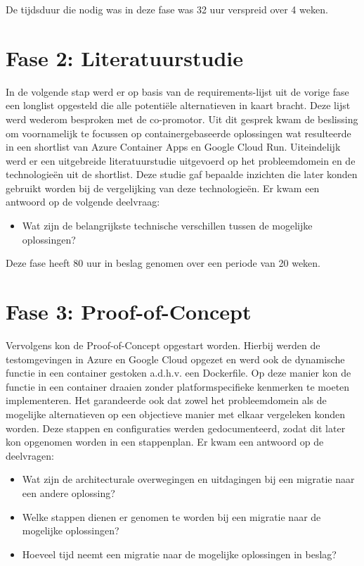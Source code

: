 De tijdsduur die nodig was in deze fase was 32 uur verspreid over 4 weken.

\section{Fase 2: Literatuurstudie}

In de volgende stap werd er op basis van de requirements-lijst uit de vorige fase een longlist opgesteld die alle potentiële alternatieven in kaart bracht. Deze lijst werd wederom besproken met de co-promotor. Uit dit gesprek kwam de beslissing om voornamelijk te focussen op containergebaseerde oplossingen wat resulteerde in een shortlist van Azure Container Apps en Google Cloud Run. Uiteindelijk werd er een uitgebreide literatuurstudie uitgevoerd op het probleemdomein en de technologieën uit de shortlist. Deze studie gaf bepaalde inzichten die later konden gebruikt worden bij de vergelijking van deze technologieën. Er kwam een antwoord op de volgende deelvraag: 

\begin{itemize}
    \item Wat zijn de belangrijkste technische verschillen tussen de mogelijke oplossingen?
\end{itemize}

Deze fase heeft 80 uur in beslag genomen over een periode van 20 weken. 

\section{Fase 3: Proof-of-Concept}

Vervolgens kon de Proof-of-Concept opgestart worden. Hierbij werden de testomgevingen in Azure en Google Cloud opgezet en werd ook de dynamische functie in een container gestoken a.d.h.v. een Dockerfile. Op deze manier kon de functie in een container draaien zonder platformspecifieke kenmerken te moeten implementeren. Het garandeerde ook dat zowel het probleemdomein als de mogelijke alternatieven op een objectieve manier met elkaar vergeleken konden worden. Deze stappen en configuraties werden gedocumenteerd, zodat dit later kon opgenomen worden in een stappenplan. Er kwam een antwoord op de deelvragen: 

\begin{itemize}
    \item Wat zijn de architecturale overwegingen en uitdagingen bij een migratie naar een andere oplossing?
    \item Welke stappen dienen er genomen te worden bij een migratie naar de mogelijke oplossingen?
    \item Hoeveel tijd neemt een migratie naar de mogelijke oplossingen in beslag?
\end{itemize}

